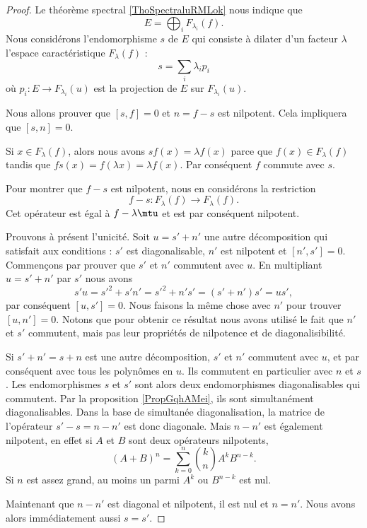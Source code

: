 \begin{proof}
    Le théorème spectral \ref{ThoSpectraluRMLok} nous indique que
    \begin{equation}
        E=\bigoplus_iF_{\lambda_i}(f).
    \end{equation}
    Nous considérons l'endomorphisme \( s\) de \( E\) qui consiste à dilater d'un facteur \( \lambda\) l'espace caractéristique \( F_{\lambda}(f)\) :
    \begin{equation}
        s=\sum_i\lambda_ip_i
    \end{equation}
    où \( p_i\colon E\to F_{\lambda_i}(u)\) est la projection de \( E\) sur \( F_{\lambda_i}(u)\).

    Nous allons prouver que \( [s,f]=0\) et \( n=f-s\) est nilpotent. Cela impliquera que \( [s,n]=0\).

    Si \( x\in F_{\lambda}(f)\), alors nous avons \( sf(x)=\lambda f(x)\) parce que \( f(x)\in F_{\lambda}(f)\) tandis que \( fs(x)=f(\lambda x)=\lambda f(x)\). Par conséquent \( f\) commute avec \( s\).

    Pour montrer que \( f-s\) est nilpotent, nous en considérons la restriction
    \begin{equation}
        f-s\colon F_{\lambda}(f)\to F_{\lambda}(f).
    \end{equation}
    Cet opérateur est égal à \( f-\lambda\mtu\) et est par conséquent nilpotent.

    Prouvons à présent l'unicité. Soit \( u=s'+n'\) une autre décomposition qui satisfait aux conditions : \( s'\) est diagonalisable, \( n'\) est nilpotent et \( [n',s']=0\). Commençons par prouver que \( s'\) et \( n'\) commutent avec \( u\). En multipliant \( u=s'+n'\) par \( s'\) nous avons
    \begin{equation}
        s'u=s'^2+s'n'=s'^2+n's'=(s'+n')s'=us',
    \end{equation}
    par conséquent \( [u,s']=0\). Nous faisons la même chose avec \( n'\) pour trouver \( [u,n']=0\). Notons que pour obtenir ce résultat nous avons utilisé le fait que \( n'\) et \( s'\) commutent, mais pas leur propriétés de nilpotence et de diagonalisibilité.
    
    
    Si \( s'+n'=s+n\) est une autre décomposition, \( s'\) et \( n'\) commutent avec \( u\), et par conséquent avec tous les polynômes en \( u\). Ils commutent en particulier avec \( n\) et \( s\). Les endomorphismes \( s\) et \( s'\) sont alors deux endomorphismes diagonalisables qui commutent. Par la proposition \ref{PropGqhAMei}, ils sont simultanément diagonalisables. Dans la base de simultanée diagonalisation, la matrice de l'opérateur \( s'-s=n-n'\) est donc diagonale. Mais \( n-n'\) est également nilpotent, en effet si \( A\) et \( B\) sont deux opérateurs nilpotents,
    \begin{equation}
        (A+B)^n=\sum_{k=0}^n\binom{k}{n}A^kB^{n-k}.
    \end{equation}
    Si \( n\) est assez grand, au moins un parmi \( A^k\) ou \( B^{n-k}\) est nul.

    Maintenant que \( n-n'\) est diagonal et nilpotent, il est nul et \( n=n'\). Nous avons alors immédiatement aussi \( s=s'\).
\end{proof}


